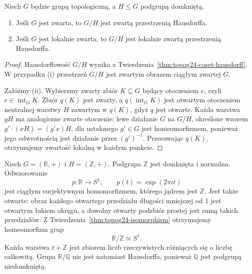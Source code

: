 \begin{twierdzenie}
\label{thm:topog24-coset-compact}
Niech \(G\) będzie grupą topologiczną,
a \(H\le G\) podgrupą domkniętą.
\begin{enumerate}[label=\textup{(\roman*)}]
\item Jeśli \(G\) jest zwarta, to \(G/H\)
jest zwartą przestrzenią Hausdorffa.
\item Jeśli \(G\) jest lokalnie zwarta,
to \(G/H\) jest lokalnie zwartą
przestrzenią Hausdorffa.
\end{enumerate}
\end{twierdzenie}
\begin{proof}
Hausdorffowość \(G/H\)
wynika z
Twierdzenia~\ref{thm:topog24-coset-hausdorff}.
W przypadku \textup{(i)}
przestrzeń \(G/H\) jest zwartym
obrazem ciągłym zwartej \(G\).

Załóżmy \textup{(ii)}.
Wybierzmy zwarty zbiór \(K\subseteq G\)
będący otoczeniem \(e\),
czyli \(e\in\operatorname{int}_G K\).
Zbiór \(q(K)\) jest zwarty,
a \(q(\operatorname{int}_G K)\)
jest otwartym otoczeniem
neutralnej warstwy \(H\)
zawartym w \(q(K)\), gdyż \(q\) jest otwarte.
Każda warstwa \(gH\)
ma analogiczne zwarte otoczenie:
lewe działanie \(G\) na \(G/H\),
określone wzorem
\(g'\cdot(xH)=(g'x)H\),
dla ustalonego \(g'\in G\)
jest homeomorfizmem,
ponieważ jego odwrotnością
jest działanie przez \((g')^{-1}\).
Przesuwając \(q(K)\), otrzymujemy
zwartość lokalną w każdym punkcie.
\end{proof}

\begin{przyklad}
\label{ex:topog24-circle-quotient}
Niech \(G=(\mathbb R,+)\)
i \(H=(\mathbb Z,+)\).
Podgrupa \(\mathbb Z\)
jest domknięta i normalna.
Odwzorowanie
\[
 p\colon\mathbb R\to S^1,\qquad
 p(t)=\exp(2\pi i t)
\]
jest ciągłym surjektywnym
homomorfizmem, którego jądrem
jest \(\mathbb Z\).
Jest także otwarte: obraz
każdego otwartego przedziału
długości mniejszej od \(1\)
jest otwartym łukiem okręgu,
a dowolny otwarty podzbiór prostej
jest sumą takich przedziałów.
Z Twierdzenia~\ref{thm:topog24-isomorphism}
otrzymujemy homeomorfizm grup
\[
 \mathbb R/\mathbb Z\simeq S^1.
\]
Każda warstwa \(t+\mathbb Z\)
jest zbiorem liczb rzeczywistych
różniących się o liczbę całkowitą.
Grupa \(\mathbb R/\mathbb Q\)
nie jest natomiast Hausdorffa,
ponieważ \(\mathbb Q\) jest
podgrupą niedomkniętą.
\end{przyklad}

